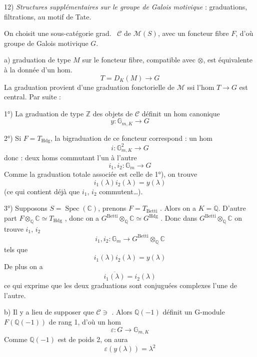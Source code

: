 \documentclass[11pt,a4paper]{article}
\begin{document}
12) \emph{Structures supplémentaires sur le groupe de Galois motivique} :
 graduations, filtrations, au motif de
Tate.

On choisit une sous-\marginal{$\otimes$-}catégorie grad.\  $\mathcal{C}$ de $\mathcal{M}(S)$, avec un foncteur fibre $F$,
 d'où groupe de Galois motivique $G$.

a)  graduation de type $M$ sur le foncteur fibre, compatible avec
$\otimes$, est équivalente à la donnée d'un hom.
\[
  T = D_{K}(M) \longrightarrow G
\]
La graduation provient d'une graduation fonctorielle de $\mathcal{M}$
 ssi l'hom $T \to G$ est central. Par suite :

1°) La graduation  de type $\mathbb{Z}$ des objets de
$\mathcal{C}$ définit un hom canonique
\[
  y : \mathbb{G}_{m,K} \longrightarrow G
\]

2°) Si $F = T_{\mathrm{Hdg}}$, la bigraduation de ce foncteur correspond : un
hom 
\[
  i : \mathbb{G}_{m,K}^{2} \longrightarrow G
\]
donc : deux homs commutant l'un à l'autre
\[
  i_{1}, i_{2} : \mathbb{G}_{m} \longrightarrow G
\]
Comme la graduation totale associée est celle de 1°), on trouve
\[
  i_{1}(\lambda) i_{2}(\lambda) = y(\lambda)
\]
(ce qui contient déjà que $i_{1}$, $i_{2}$ commutent…).

3°) Supposons $S = \operatorname{Spec}(\mathbb{C})$, prenons
$F = T_{\mathrm{Betti}}$ . Alors on
 a $K = \mathbb{Q}$. D'autre part
$F \otimes_{\mathbb{Q}} \mathbb{C} \simeq T_{\mathrm{Hdg}}$
\struck{\ill{}}, donc on a
$G^{\mathrm{Betti}} \otimes_{\mathbb{Q}} \mathbb{C} \simeq G^{\mathrm{Hdg}}$
\struck{\ill{}}. Donc dans $G^{\mathrm{Betti}} \otimes_{\mathbb{Q}} \mathbb{C}$
on trouve \struck{\ill{}} $i_{1}$, $i_{2}$
\[
  i_{1}, i_{2} : \mathbb{G}_{m} \to G^{\mathrm{Betti}} \otimes_{\mathbb{Q}}
  \mathbb{C}
\]
tels que
\[
  i_{1}(\lambda) i_{2}(\lambda) = y(\lambda)
\]
De plus on a
\[
  \overline{i_{1}(\lambda)} = i_{2}(\lambda)
\]
ce qui exprime que les deux graduations  sont conjuguées
complexes l'une de l'autre.

b) Il y a lieu de supposer que $\mathcal{C} \ni$
. Alors $\mathbb{Q}(-1)$  définit un
G-module $F(\mathbb{Q}(-1))$ de rang 1, d'où un hom
\[
  \varepsilon : G \longrightarrow \mathbb{G}_{m,K}
\]
Comme $\mathbb{Q}(-1)$ est de  poids 2, on aura
\[
  \boxed{\varepsilon(y(\lambda)) = \lambda^{2}}
\]
\end{document}

